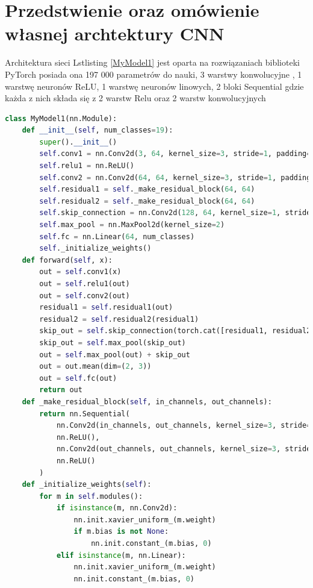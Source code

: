 \documentclass[12pt,twoside]{article}
\begin{document}
\clearpage
\section{Przedstwienie oraz omówienie własnej archtektury CNN}

Architektura sieci Lstlisting \ref{MyModel1} jest oparta na rozwiązaniach biblioteki PyTorch posiada ona 197 000 parametrów do nauki, 3 warstwy konwolucyjne , 1 warstwę neuronów ReLU, 1 warstwę neuronów linowych, 2 bloki Sequential gdzie każda z nich składa się z 2 warstw Relu oraz 2 warstw konwolucyjnych

\begin{lstlisting}[language=Python,caption= Struktura głębokiej sieci konwolucyjnej MyModel1 ,label={MyModel1}]
	class MyModel1(nn.Module):
    def __init__(self, num_classes=19):
        super().__init__()
        self.conv1 = nn.Conv2d(3, 64, kernel_size=3, stride=1, padding=1)
        self.relu1 = nn.ReLU()
        self.conv2 = nn.Conv2d(64, 64, kernel_size=3, stride=1, padding=1)
        self.residual1 = self._make_residual_block(64, 64)
        self.residual2 = self._make_residual_block(64, 64)
        self.skip_connection = nn.Conv2d(128, 64, kernel_size=1, stride=1)   
        self.max_pool = nn.MaxPool2d(kernel_size=2)
        self.fc = nn.Linear(64, num_classes)
        self._initialize_weights()
    def forward(self, x):
        out = self.conv1(x)
        out = self.relu1(out)
        out = self.conv2(out)
        residual1 = self.residual1(out)
        residual2 = self.residual2(residual1)
        skip_out = self.skip_connection(torch.cat([residual1, residual2], dim=1))
        skip_out = self.max_pool(skip_out)  
        out = self.max_pool(out) + skip_out
        out = out.mean(dim=(2, 3))  
        out = self.fc(out)
        return out
    def _make_residual_block(self, in_channels, out_channels):
        return nn.Sequential(
            nn.Conv2d(in_channels, out_channels, kernel_size=3, stride=1, padding=1),
            nn.ReLU(),
            nn.Conv2d(out_channels, out_channels, kernel_size=3, stride=1, padding=1),
            nn.ReLU()
        )
    def _initialize_weights(self):
        for m in self.modules():
            if isinstance(m, nn.Conv2d):
                nn.init.xavier_uniform_(m.weight)
                if m.bias is not None:
                    nn.init.constant_(m.bias, 0)
            elif isinstance(m, nn.Linear):
                nn.init.xavier_uniform_(m.weight)
                nn.init.constant_(m.bias, 0)
\end{lstlisting}
\end{document}
